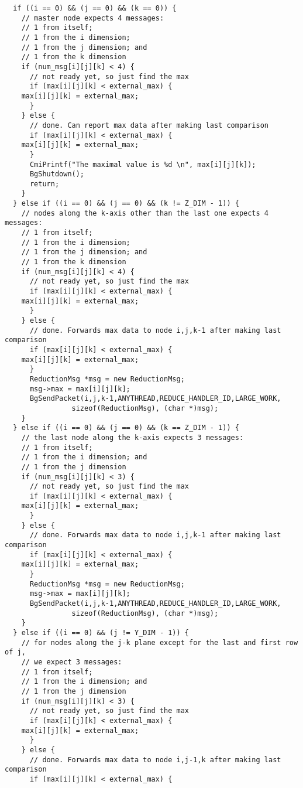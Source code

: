 \documentclass[10pt]{article}
\begin{document}
\begin{verbatim}
  if ((i == 0) && (j == 0) && (k == 0)) {
    // master node expects 4 messages:
    // 1 from itself;
    // 1 from the i dimension;
    // 1 from the j dimension; and
    // 1 from the k dimension
    if (num_msg[i][j][k] < 4) {
      // not ready yet, so just find the max
      if (max[i][j][k] < external_max) {
	max[i][j][k] = external_max;
      }
    } else {
      // done. Can report max data after making last comparison
      if (max[i][j][k] < external_max) {
	max[i][j][k] = external_max;
      }
      CmiPrintf("The maximal value is %d \n", max[i][j][k]);
      BgShutdown();
      return;
    }
  } else if ((i == 0) && (j == 0) && (k != Z_DIM - 1)) {
    // nodes along the k-axis other than the last one expects 4 messages:
    // 1 from itself;
    // 1 from the i dimension;
    // 1 from the j dimension; and
    // 1 from the k dimension
    if (num_msg[i][j][k] < 4) {
      // not ready yet, so just find the max
      if (max[i][j][k] < external_max) {
	max[i][j][k] = external_max;
      }
    } else {
      // done. Forwards max data to node i,j,k-1 after making last comparison
      if (max[i][j][k] < external_max) {
	max[i][j][k] = external_max;
      }
      ReductionMsg *msg = new ReductionMsg;
      msg->max = max[i][j][k];
      BgSendPacket(i,j,k-1,ANYTHREAD,REDUCE_HANDLER_ID,LARGE_WORK, 
				sizeof(ReductionMsg), (char *)msg);
    }
  } else if ((i == 0) && (j == 0) && (k == Z_DIM - 1)) {
    // the last node along the k-axis expects 3 messages:
    // 1 from itself;
    // 1 from the i dimension; and
    // 1 from the j dimension
    if (num_msg[i][j][k] < 3) {
      // not ready yet, so just find the max
      if (max[i][j][k] < external_max) {
	max[i][j][k] = external_max;
      }
    } else {
      // done. Forwards max data to node i,j,k-1 after making last comparison
      if (max[i][j][k] < external_max) {
	max[i][j][k] = external_max;
      }
      ReductionMsg *msg = new ReductionMsg;
      msg->max = max[i][j][k];
      BgSendPacket(i,j,k-1,ANYTHREAD,REDUCE_HANDLER_ID,LARGE_WORK, 
				sizeof(ReductionMsg), (char *)msg);
    }
  } else if ((i == 0) && (j != Y_DIM - 1)) {
    // for nodes along the j-k plane except for the last and first row of j,
    // we expect 3 messages:
    // 1 from itself;
    // 1 from the i dimension; and
    // 1 from the j dimension
    if (num_msg[i][j][k] < 3) {
      // not ready yet, so just find the max
      if (max[i][j][k] < external_max) {
	max[i][j][k] = external_max;
      }
    } else {
      // done. Forwards max data to node i,j-1,k after making last comparison
      if (max[i][j][k] < external_max) {

\end{verbatim}
\end{document}
